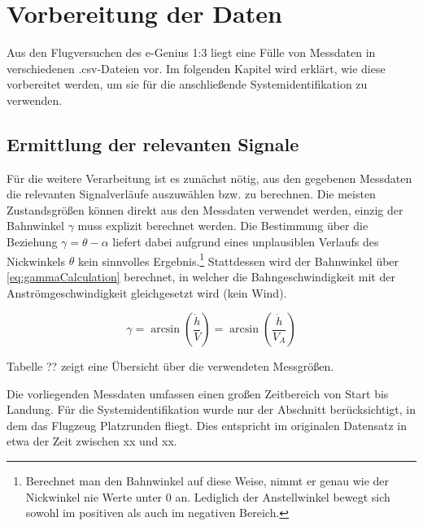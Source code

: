 \chapter{Vorbereitung der Daten}
Aus den Flugversuchen des e-Genius 1:3 liegt eine Fülle von Messdaten in verschiedenen .csv-Dateien vor. Im folgenden Kapitel 
wird erklärt, wie diese vorbereitet werden, um sie für die anschließende Systemidentifikation zu verwenden.



\section{Ermittlung der relevanten Signale} %
Für die weitere Verarbeitung ist es zunächst nötig, aus den gegebenen Messdaten die relevanten Signalverläufe auszuwählen 
bzw. zu berechnen. Die meisten Zustandsgrößen können direkt aus den Messdaten verwendet werden, einzig der Bahnwinkel $ 
\gamma $ muss explizit berechnet werden. Die Bestimmung über die Beziehung $ \gamma=\theta-\alpha $ liefert dabei aufgrund 
eines unplausiblen Verlaufs des Nickwinkels $ \theta $ kein sinnvolles Ergebnis.\footnote{Berechnet man den Bahnwinkel auf 
diese Weise, nimmt er genau wie der Nickwinkel nie Werte unter 0 an. Lediglich der Anstellwinkel bewegt sich sowohl im 
positiven als auch im negativen Bereich.} Stattdessen wird der Bahnwinkel über \cref{eq:gammaCalculation} berechnet, in 
welcher die Bahngeschwindigkeit mit der Anströmgeschwindigkeit gleichgesetzt wird (kein Wind).

\begin{equation}
	\gamma = \arcsin{\left( \frac{\dot h}{V} \right)} = \arcsin{\left( \frac{\dot h}{V_A} \right)}
	\label{eq:gammaCalculation}
\end{equation}

Tabelle ?? zeigt eine Übersicht über die verwendeten Messgrößen.

Die vorliegenden Messdaten umfassen einen großen Zeitbereich von Start bis Landung. Für die Systemidentifikation wurde nur 
der Abschnitt berücksichtigt, in dem das Flugzeug Platzrunden fliegt. Dies entspricht im originalen Datensatz in etwa der 
Zeit zwischen xx und xx.


